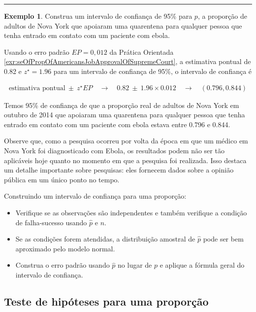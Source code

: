 \documentclass[
]{book}
\theoremstyle{definition}
\theoremstyle{definition}
\newtheorem{example}{Exemplo}[chapter]
\theoremstyle{definition}
\theoremstyle{definition}
\theoremstyle{remark}
\begin{document}
\begin{center}\rule{0.5\linewidth}{0.5pt}\end{center}

\begin{example}
\protect\hypertarget{exm:unnamed-chunk-226}{}{\label{exm:unnamed-chunk-226} }Construa um intervalo de confiança de 95\% para \(p\), a proporção de adultos de Nova York que apoiaram uma quarentena para qualquer pessoa que tenha entrado em contato com um paciente com ebola.
\end{example}

Usando o erro padrão \(EP = 0,012\) da Prática Orientada \ref{exr:seOfPropOfAmericansJobApprovalOfSupremeCourt}, a estimativa pontual de 0.82 e \(z^{\star} = 1.96\) para um intervalo de confiança de 95\%, o intervalo de confiança é

\begin{eqnarray*}
\text{estimativa pontual} \ \pm\ z^{\star}EP \quad\to\quad 0.82 \ \pm\ 1.96\times 0.012 \quad\to\quad (0.796, 0.844)
\end{eqnarray*}

Temos 95\% de confiança de que a proporção real de adultos de Nova York em outubro de 2014 que apoiaram uma quarentena para qualquer pessoa que tenha entrado em contato com um paciente com ebola estava entre 0.796 e 0.844.

Observe que, como a pesquisa ocorreu por volta da época em que um médico em Nova York foi diagnosticado com Ebola, os resultados podem não ser tão aplicáveis hoje quanto no momento em que a pesquisa foi realizada. Isso destaca um detalhe importante sobre pesquisas: eles fornecem dados sobre a opinião pública em um único ponto no tempo.

Construindo um intervalo de confiança para uma proporção:

\begin{itemize}
\item
  Verifique se as observações são independentes e também verifique a condição de falha-sucesso usando \(\hat{p}\) e \(n\).
\item
  Se as condições forem atendidas, a distribuição amostral de \(\hat{p}\) pode ser bem aproximado pelo modelo normal.
\item
  Construa o erro padrão usando \(\hat{p}\) no lugar de \(p\) e aplique a fórmula geral do intervalo de confiança.
\end{itemize}

\hypertarget{HTOneProportion}{%
\subsection{Teste de hipóteses para uma proporção}\label{HTOneProportion}}
\end{document}
